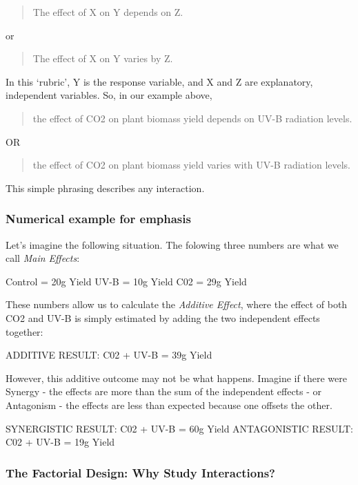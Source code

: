 \documentclass[
]{book}
\begin{document}
\begin{quote}
The effect of X on Y depends on Z.
\end{quote}

or

\begin{quote}
The effect of X on Y varies by Z.
\end{quote}

In this `rubric', Y is the response variable, and X and Z are explanatory, independent variables. So, in our example above,

\begin{quote}
the effect of CO2 on plant biomass yield depends on UV-B radiation levels.
\end{quote}

OR

\begin{quote}
the effect of CO2 on plant biomass yield varies with UV-B radiation levels.
\end{quote}

This simple phrasing describes any interaction.

\hypertarget{numerical-example-for-emphasis}{%
\subsubsection{Numerical example for emphasis}\label{numerical-example-for-emphasis}}

Let's imagine the following situation. The folowing three numbers are what we call \emph{Main Effects}:

Control = 20g Yield
UV-B = 10g Yield
C02 = 29g Yield

These numbers allow us to calculate the \emph{Additive Effect}, where the effect of both CO2 and UV-B is simply estimated by adding the two independent effects together:

ADDITIVE RESULT: C02 + UV-B = 39g Yield

However, this additive outcome may not be what happens. Imagine if there were Synergy - the effects are more than the sum of the independent effects - or Antagonism - the effects are less than expected because one offsets the other.

SYNERGISTIC RESULT: C02 + UV-B = 60g Yield
ANTAGONISTIC RESULT: C02 + UV-B = 19g Yield

\hypertarget{the-factorial-design-why-study-interactions}{%
\subsubsection{The Factorial Design: Why Study Interactions?}\label{the-factorial-design-why-study-interactions}}
\end{document}
